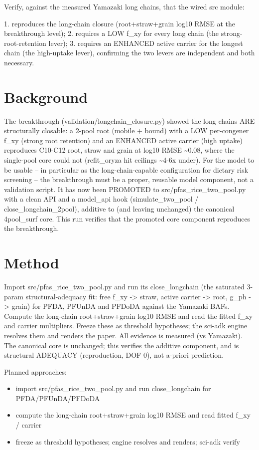 \documentclass{article}
\begin{document}
Verify, against the measured Yamazaki long chains, that the wired src module:

1. reproduces the long-chain closure (root+straw+grain log10 RMSE at the breakthrough level);
2. requires a LOW f\_xy for every long chain (the strong-root-retention lever);
3. requires an ENHANCED active carrier for the longest chain (the high-uptake lever),
   confirming the two levers are independent and both necessary.

\section{Background}
The breakthrough (validation/longchain\_closure.py) showed the long chains ARE
structurally closable: a 2-pool root (mobile + bound) with a LOW per-congener f\_xy
(strong root retention) and an ENHANCED active carrier (high uptake) reproduces
C10-C12 root, straw and grain at log10 RMSE \textasciitilde{}0.08, where the single-pool core could
not (refit\_oryza hit ceilings \textasciitilde{}4-6x under). For the model to be usable -- in
particular as the long-chain-capable configuration for dietary risk screening -- the
breakthrough must be a proper, reusable model component, not a validation script. It
has now been PROMOTED to src/pfas\_rice\_two\_pool.py with a clean API and a model\_api
hook (simulate\_two\_pool / close\_longchain\_2pool), additive to (and leaving unchanged)
the canonical 4pool\_surf core. This run verifies that the promoted core component
reproduces the breakthrough.

\section{Method}
Import src/pfas\_rice\_two\_pool.py and run its close\_longchain (the saturated 3-param
structural-adequacy fit: free f\_xy -> straw, active carrier -> root, g\_ph -> grain)
for PFDA, PFUnDA and PFDoDA against the Yamazaki BAFs. Compute the long-chain
root+straw+grain log10 RMSE and read the fitted f\_xy and carrier multipliers. Freeze
these as threshold hypotheses; the sci-adk engine resolves them and renders the paper.
All evidence is measured (vs Yamazaki). The canonical core is unchanged; this verifies
the additive component, and is structural ADEQUACY (reproduction, DOF 0), not a-priori
prediction.

Planned approaches:
\begin{itemize}
  \item import src/pfas\_rice\_two\_pool.py and run close\_longchain for PFDA/PFUnDA/PFDoDA
  \item compute the long-chain root+straw+grain log10 RMSE and read fitted f\_xy / carrier
  \item freeze as threshold hypotheses; engine resolves and renders; sci-adk verify
\end{itemize}
\end{document}
